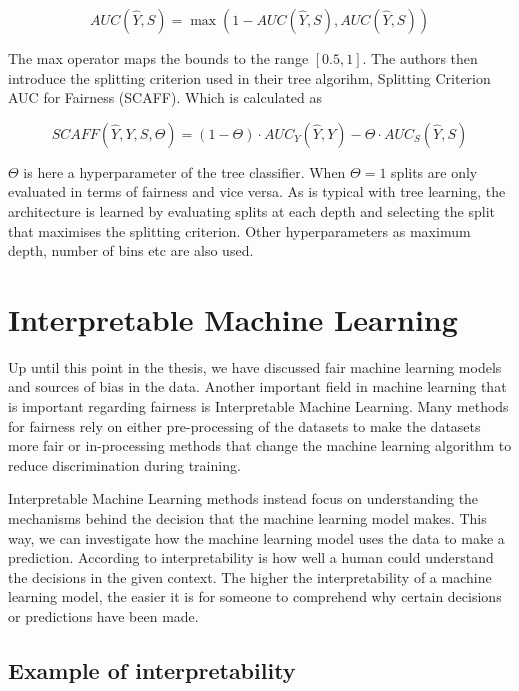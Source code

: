 \begin{equation}
    AUC(\hat{Y}, S) = \max(1 - AUC(\hat{Y}, S), AUC(\hat{Y}, S))
\end{equation}

The max operator maps the bounds to the range $[0.5, 1]$. The authors then introduce the splitting criterion used in their tree algorihm, Splitting Criterion AUC for Fairness (SCAFF). Which is calculated as

\begin{equation*}
    SCAFF(\hat{Y}, Y, S, \Theta) = (1 - \Theta) \cdot AUC_Y(\hat{Y}, Y) - \Theta \cdot AUC_S(\hat{Y}, S)
\end{equation*}

$\Theta$ is here a hyperparameter of the tree classifier. When $\Theta = 1$ splits are only evaluated in terms of fairness and vice versa.  As is typical with tree learning, the architecture is learned by evaluating splits at each depth and selecting the split that maximises the splitting criterion. Other hyperparameters as maximum depth, number of bins etc are also used.

\section{Interpretable Machine Learning}

Up until this point in the thesis, we have discussed fair machine learning models and sources of bias in the data. Another important field in machine learning that is important regarding fairness is Interpretable Machine Learning. Many methods for fairness rely on either pre-processing of the datasets to make the datasets more fair or in-processing methods that change the machine learning algorithm to reduce discrimination during training. \cite{Mehrabi:2021:CSUR} 

Interpretable Machine Learning methods instead focus on understanding the mechanisms behind the decision that the machine learning model makes. This way, we can investigate how the machine learning model uses the data to make a prediction. According to \citet{Miller:2019:AIJ} interpretability is how well a human could understand the decisions in the given context. The higher the interpretability of a machine learning model, the easier it is for someone to comprehend why certain decisions or predictions have been made. \cite{Molnar:2020:Book}

\subsection{Example of interpretability}

